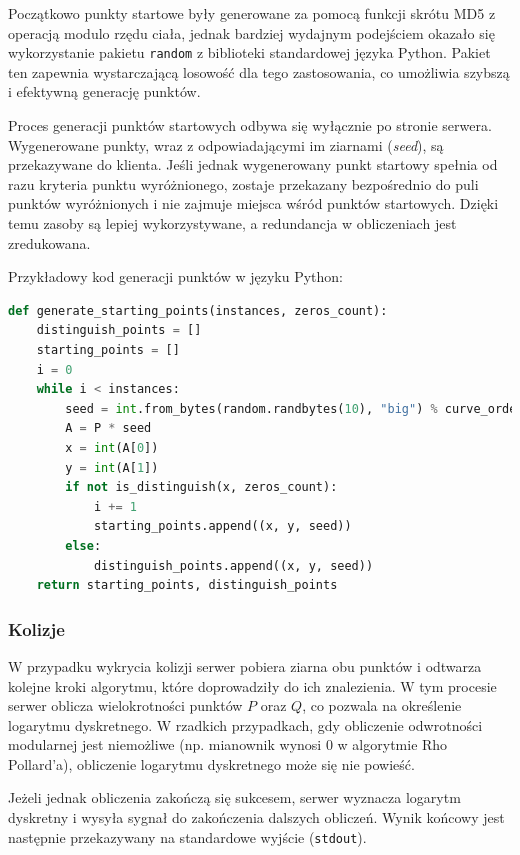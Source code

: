 Początkowo punkty startowe były generowane za pomocą funkcji skrótu MD5 z operacją
modulo rzędu ciała, jednak bardziej wydajnym podejściem okazało się wykorzystanie
pakietu \texttt{random} z biblioteki standardowej języka Python. Pakiet ten
zapewnia wystarczającą losowość dla tego zastosowania, co umożliwia szybszą
i efektywną generację punktów.

Proces generacji punktów startowych odbywa się wyłącznie po stronie serwera.
Wygenerowane punkty, wraz z odpowiadającymi im ziarnami (\textit{seed}), są
przekazywane do klienta. Jeśli jednak wygenerowany punkt startowy spełnia od razu
kryteria punktu wyróżnionego, zostaje przekazany bezpośrednio do puli punktów
wyróżnionych i nie zajmuje miejsca wśród punktów startowych. Dzięki temu zasoby
są lepiej wykorzystywane, a redundancja w obliczeniach jest zredukowana.

Przykładowy kod generacji punktów w języku Python:

\begin{lstlisting}[language=Python, caption=Generacja punktów startowych]
def generate_starting_points(instances, zeros_count):
    distinguish_points = []
    starting_points = []
    i = 0
    while i < instances:
        seed = int.from_bytes(random.randbytes(10), "big") % curve_order
        A = P * seed
        x = int(A[0])
        y = int(A[1])
        if not is_distinguish(x, zeros_count):
            i += 1
            starting_points.append((x, y, seed))
        else:
            distinguish_points.append((x, y, seed))
    return starting_points, distinguish_points
\end{lstlisting}

\subsubsection{Kolizje}

W przypadku wykrycia kolizji serwer pobiera ziarna obu punktów i odtwarza
kolejne kroki algorytmu, które doprowadziły do ich znalezienia. W tym procesie
serwer oblicza wielokrotności punktów $P$ oraz $Q$, co pozwala na określenie
logarytmu dyskretnego. W rzadkich przypadkach, gdy obliczenie odwrotności modularnej
jest niemożliwe (np. mianownik wynosi $0$ w algorytmie Rho Pollard'a), obliczenie
logarytmu dyskretnego może się nie powieść.

Jeżeli jednak obliczenia zakończą się sukcesem, serwer wyznacza logarytm
dyskretny i wysyła sygnał do zakończenia dalszych obliczeń. Wynik końcowy jest
następnie przekazywany na standardowe wyjście (\texttt{stdout}).

